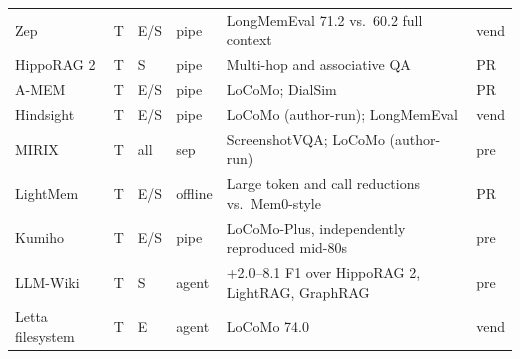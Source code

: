 \documentclass[11pt]{article}
\begin{document}
\begin{table}[p]
\begin{tabularx}{\textwidth}{L{2.6cm} L{1.1cm} L{1.0cm} L{1.2cm} X L{1.0cm}}
Zep \citep{rasmussen2025zep} & T & E/S & pipe & LongMemEval 71.2 vs.\ 60.2 full context & vend \\
HippoRAG 2 \citep{gutierrez2025hipporag2} & T & S & pipe & Multi-hop and associative QA & PR \\
A-MEM \citep{xu2025amem} & T & E/S & pipe & LoCoMo; DialSim & PR \\
Hindsight \citep{latimer2025hindsight} & T & E/S & pipe & LoCoMo (author-run); LongMemEval & vend \\
MIRIX \citep{wang2025mirix} & T & all & sep & ScreenshotVQA; LoCoMo (author-run) & pre \\
LightMem \citep{fang2025lightmem} & T & E/S & offline & Large token and call reductions vs.\ Mem0-style & PR \\
Kumiho \citep{park2026kumiho} & T & E/S & pipe & LoCoMo-Plus, independently reproduced mid-80s & pre \\
LLM-Wiki \citep{ming2026llmwiki} & T & S & agent & +2.0--8.1 F1 over HippoRAG 2, LightRAG, GraphRAG & pre \\
Letta filesystem \citep{letta2025filesystem} & T & E & agent & LoCoMo 74.0 & vend \\
\bottomrule
\end{tabularx}
\end{table}
\end{document}
